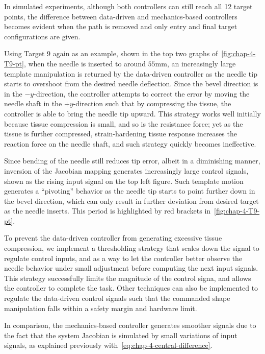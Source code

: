 In simulated experiments, although both controllers can still reach all 12 target points, the difference between data-driven and mechanics-based controllers becomes evident when the path is removed and only entry and final target configurations are given.

Using Target 9 again as an example, shown in the top two graphs of~\cref{fig:chap-4-T9-pt}, when the needle is inserted to around $55$mm, an increasingly large template manipulation is returned by the data-driven controller as the needle tip starts to overshoot from the desired needle deflection. Since the bevel direction is in the $-y$-direction, the controller attempts to correct the error by moving the needle shaft in the $+y$-direction such that by compressing the tissue, the controller is able to bring the needle tip upward. This strategy works well initially because tissue compression is small, and so is the resistance force; yet as the tissue is further compressed, strain-hardening tissue response increases the reaction force on the needle shaft, and such strategy quickly becomes ineffective.

Since bending of the needle still reduces tip error, albeit in a diminishing manner, inversion of the Jacobian mapping generates increasingly large control signals, shown as the rising input signal on the top left figure. Such template motion generates a ``pivoting'' behavior as the needle tip starts to point further down in the bevel direction, which can only result in further deviation from desired target as the needle inserts. This period is highlighted by red brackets in~\cref{fig:chap-4-T9-pt}.

To prevent the data-driven controller from generating excessive tissue compression, we implement a thresholding strategy that scales down the signal to regulate control inputs, and as a way to let the controller better observe the needle behavior under small adjustment before computing the next input signals. This strategy successfully limits the magnitude of the control signa, and allows the controller to complete the task. Other techniques can also be implemented to regulate the data-driven control signals such that the commanded shape manipulation falls within a safety margin and hardware limit.

In comparison, the mechanics-based controller generates smoother signals due to the fact that the system Jacobian is simulated by small variations of input signals, as explained previously with~\cref{eq:chap-4-central-difference}.

